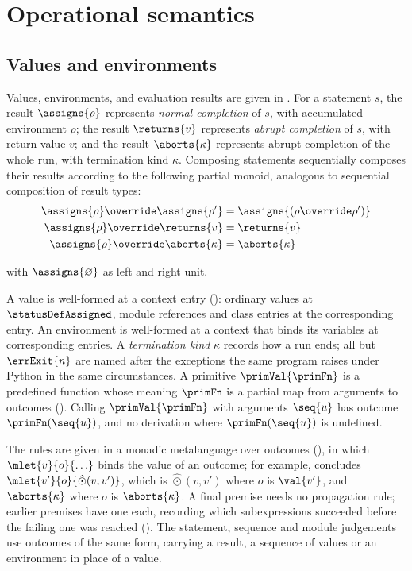 \section{Operational semantics}
\label{sec:opsem}

\subsection{Values and environments}

Values, environments, and evaluation results are given in . For a statement $s$, the result
$\assigns{\rho}$ represents \emph{normal completion} of $s$, with accumulated environment $\rho$; the result
$\returns{v}$ represents \emph{abrupt completion} of $s$, with return value $v$; and the result
$\aborts{\kappa}$ represents abrupt completion of the whole run, with termination kind $\kappa$.
Composing statements sequentially composes their results according to the following partial monoid, analogous
to sequential composition of result types:
{\small
\begin{align*}
\assigns{\rho} \override \assigns{\rho'} & = \assigns{(\rho \override \rho')} \\
\assigns{\rho} \override \returns{v} & = \returns{v} \\
\assigns{\rho} \override \aborts{\kappa} & = \aborts{\kappa}
\end{align*}}

with $\assigns{\varnothing}$ as left and right unit.



A value is well-formed at a context entry (): ordinary values at
$\statusDefAssigned$, module references and class entries at the corresponding entry. An environment is
well-formed at a context that binds its variables at corresponding entries. A \emph{termination
kind} $\kappa$ records how a run ends; all but $\errExit{n}$ are named after the exceptions the same program
raises under Python in the same circumstances. A primitive
$\primVal{\primFn}$ is a predefined function whose meaning $\primFn$ is a partial map from
arguments to outcomes (). Calling $\primVal{\primFn}$ with arguments $\seq{u}$ has outcome
$\primFn(\seq{u})$, and no derivation where $\primFn(\seq{u})$ is undefined.



The rules are given in a monadic metalanguage over outcomes (), in which
$\mlet{v}{o}{\ldots}$ binds the value of an outcome; for example,  concludes
$\mlet{v'}{o}{\hat{\odot}(v, v')}$, which is $\hat{\odot}(v, v')$ where $o$ is $\val{v'}$, and
$\aborts{\kappa}$ where $o$ is $\aborts{\kappa}$. A final
premise needs no propagation rule; earlier premises have one each, recording which subexpressions succeeded
before the failing one was reached (). The statement, sequence and module judgements use
outcomes of the same form, carrying a result, a sequence of values or an environment in place of a value.

